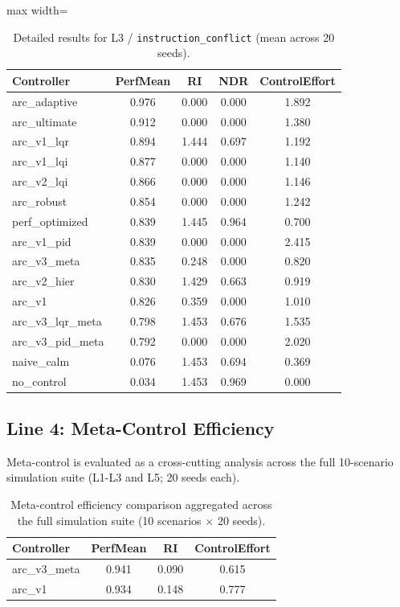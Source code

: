 \documentclass{article}
\begin{document}
\begin{table}[H]
\centering
\footnotesize
\caption{Detailed results for L3 / \texttt{instruction\_conflict} (mean across 20 seeds).}
\label{tab:g8_instruction_conflict}
\begin{adjustbox}{max width=\textwidth}
\begin{tabular}{@{}lcccc@{}}
\toprule
Controller & PerfMean & RI & NDR & ControlEffort \\ \midrule
arc\_adaptive & 0.976 & 0.000 & 0.000 & 1.892 \\
arc\_ultimate & 0.912 & 0.000 & 0.000 & 1.380 \\
arc\_v1\_lqr & 0.894 & 1.444 & 0.697 & 1.192 \\
arc\_v1\_lqi & 0.877 & 0.000 & 0.000 & 1.140 \\
arc\_v2\_lqi & 0.866 & 0.000 & 0.000 & 1.146 \\
arc\_robust & 0.854 & 0.000 & 0.000 & 1.242 \\
perf\_optimized & 0.839 & 1.445 & 0.964 & 0.700 \\
arc\_v1\_pid & 0.839 & 0.000 & 0.000 & 2.415 \\
arc\_v3\_meta & 0.835 & 0.248 & 0.000 & 0.820 \\
arc\_v2\_hier & 0.830 & 1.429 & 0.663 & 0.919 \\
arc\_v1 & 0.826 & 0.359 & 0.000 & 1.010 \\
arc\_v3\_lqr\_meta & 0.798 & 1.453 & 0.676 & 1.535 \\
arc\_v3\_pid\_meta & 0.792 & 0.000 & 0.000 & 2.020 \\
naive\_calm & 0.076 & 1.453 & 0.694 & 0.369 \\
no\_control & 0.034 & 1.453 & 0.969 & 0.000 \\ \bottomrule
\end{tabular}
\end{adjustbox}
\end{table}

\FloatBarrier
\subsection{Line 4: Meta-Control Efficiency}

Meta-control is evaluated as a cross-cutting analysis across the full 10-scenario simulation suite (L1-L3 and L5; 20 seeds each).

\begin{table}[H]
\centering
\footnotesize
\caption{Meta-control efficiency comparison aggregated across the full simulation suite (10 scenarios $\times$ 20 seeds).}
\label{tab:g9_meta_control}
\begin{tabular}{@{}lccc@{}}
\toprule
Controller & PerfMean & RI & ControlEffort \\ \midrule
arc\_v3\_meta & 0.941 & 0.090 & 0.615 \\
arc\_v1 & 0.934 & 0.148 & 0.777 \\ \bottomrule
\end{tabular}
\end{table}
\end{document}

